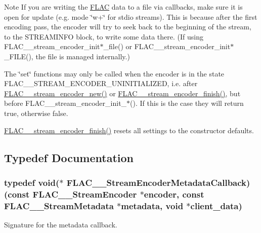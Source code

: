 \begin{DoxyNote}{Note}
If you are writing the \hyperlink{namespace_f_l_a_c}{F\+L\+AC} data to a file via callbacks, make sure it is open for update (e.\+g. mode \char`\"{}w+\char`\"{} for stdio streams). This is because after the first encoding pass, the encoder will try to seek back to the beginning of the stream, to the S\+T\+R\+E\+A\+M\+I\+N\+FO block, to write some data there. (If using F\+L\+A\+C\+\_\+\+\_\+stream\+\_\+encoder\+\_\+init$\ast$\+\_\+file() or F\+L\+A\+C\+\_\+\+\_\+stream\+\_\+encoder\+\_\+init$\ast$\+\_\+\+F\+I\+LE(), the file is managed internally.)

The \char`\"{}set\char`\"{} functions may only be called when the encoder is in the state F\+L\+A\+C\+\_\+\+\_\+\+S\+T\+R\+E\+A\+M\+\_\+\+E\+N\+C\+O\+D\+E\+R\+\_\+\+U\+N\+I\+N\+I\+T\+I\+A\+L\+I\+Z\+ED, i.\+e. after \hyperlink{group__flac__stream__encoder_ga35f3d94452bcf0a90a31c7d770b200bc}{F\+L\+A\+C\+\_\+\+\_\+stream\+\_\+encoder\+\_\+new()} or \hyperlink{group__flac__stream__encoder_gab2c1e5477c1e3fe9ad0d722ff8eecda2}{F\+L\+A\+C\+\_\+\+\_\+stream\+\_\+encoder\+\_\+finish()}, but before F\+L\+A\+C\+\_\+\+\_\+stream\+\_\+encoder\+\_\+init\+\_\+$\ast$(). If this is the case they will return {\ttfamily true}, otherwise {\ttfamily false}.

\hyperlink{group__flac__stream__encoder_gab2c1e5477c1e3fe9ad0d722ff8eecda2}{F\+L\+A\+C\+\_\+\+\_\+stream\+\_\+encoder\+\_\+finish()} resets all settings to the constructor defaults. 
\end{DoxyNote}


\subsection{Typedef Documentation}
\subsubsection[{\texorpdfstring{F\+L\+A\+C\+\_\+\+\_\+\+Stream\+Encoder\+Metadata\+Callback}{FLAC__StreamEncoderMetadataCallback}}]{\setlength{\rightskip}{0pt plus 5cm}typedef {\bf void}($\ast$ F\+L\+A\+C\+\_\+\+\_\+\+Stream\+Encoder\+Metadata\+Callback) ({\bf const} {\bf F\+L\+A\+C\+\_\+\+\_\+\+Stream\+Encoder} $\ast$encoder, {\bf const} {\bf F\+L\+A\+C\+\_\+\+\_\+\+Stream\+Metadata} $\ast$metadata, {\bf void} $\ast$client\+\_\+data)}\hypertarget{group__flac__stream__encoder_ga091fbf3340d85bcbda1090c31bc320cf}{}\label{group__flac__stream__encoder_ga091fbf3340d85bcbda1090c31bc320cf}
Signature for the metadata callback.

